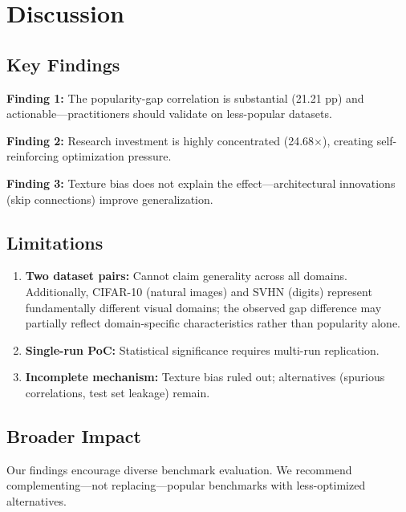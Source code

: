 \section{Discussion}

\subsection{Key Findings}

\textbf{Finding 1:} The popularity-gap correlation is substantial (21.21 pp) and actionable---practitioners should validate on less-popular datasets.

\textbf{Finding 2:} Research investment is highly concentrated (24.68$\times$), creating self-reinforcing optimization pressure.

\textbf{Finding 3:} Texture bias does not explain the effect---architectural innovations (skip connections) improve generalization.

\subsection{Limitations}

\begin{enumerate}
    \item \textbf{Two dataset pairs:} Cannot claim generality across all domains. Additionally, CIFAR-10 (natural images) and SVHN (digits) represent fundamentally different visual domains; the observed gap difference may partially reflect domain-specific characteristics rather than popularity alone.
    \item \textbf{Single-run PoC:} Statistical significance requires multi-run replication.
    \item \textbf{Incomplete mechanism:} Texture bias ruled out; alternatives (spurious correlations, test set leakage) remain.
\end{enumerate}

\subsection{Broader Impact}

Our findings encourage diverse benchmark evaluation. We recommend complementing---not replacing---popular benchmarks with less-optimized alternatives.
